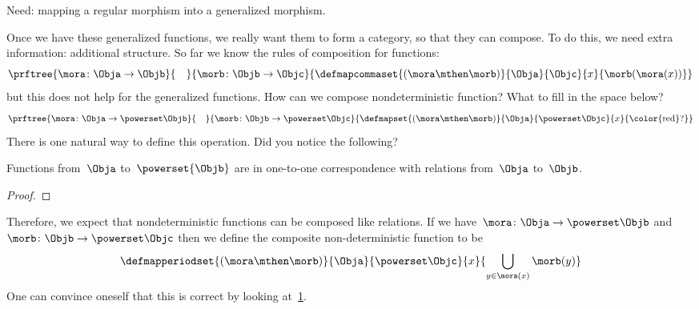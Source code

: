 Need: mapping a regular morphism into a generalized morphism.

Once we have these generalized functions, we really want them to form a category, so that they can compose.
To do this, we need extra information: additional structure.
So far we know the rules of composition for functions:
%
\begin{equation}
	\label{eq:monad-function-composition}
	\prftree{\mora\colon \Obja \to \Objb}{\quad}{\morb\colon \Objb \to \Objc}
	{
		\defmapcommaset{
			(\mora\mthen\morb)
		}{
			\Obja
		}{
			\Objc
		}{
			x
		}{
			\morb(\mora(x))
		}
	}
\end{equation}
%
but this does not help for the generalized functions.
How can we compose nondeterministic function?
What to fill in the space below?
%
\begin{equation}
	\label{eq:monad-gen-function-composition}
	\prftree{\mora\colon \Obja \to \powerset\Objb}{\quad}{\morb\colon \Objb \to \powerset \Objc}
	{
		\defmapset{(\mora\mthen\morb)}{\Obja}{\powerset\Objc}%
		{x}{\text{\color{red}?}}}
\end{equation}
%
There is one natural way to define this operation.
Did you notice the following?

\begin{lemma}
	\label{lem:powersets-relations}
	Functions from~$\Obja$ to~$\powerset{\Objb}$ are in one-to-one correspondence with relations from~$\Obja$ to~$\Objb$.
\end{lemma}

\begin{proof}
\end{proof}

Therefore, we expect that nondeterministic functions can be composed like relations.
If we have~$\mora\colon \Obja \to \powerset\Objb$ and~$\morb\colon \Objb \to \powerset \Objc$ then we define the composite non-deterministic function to be
%
\begin{equation}
	\label{eq:fish-nondet}
	\defmapperiodset{(\mora\mthen\morb)}{\Obja}{\powerset\Objc}%
	{x}{ \displaystyle \bigcup_{y\in \mora(x)}\morb(y)}
\end{equation}
%
One can convince oneself that this is correct by looking at~\cref{fig:mapping-nondeterministic}.

\begin{figure}[h]
	\caption{}
	\label{fig:mapping-nondeterministic}
\end{figure}

